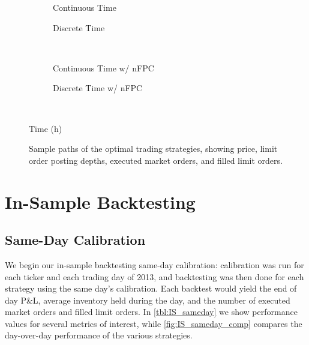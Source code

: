 \begin{figure}
\centering
\begin{subfigure}{.45\linewidth}
  \centering
  \setlength\figureheight{\linewidth} 
  \setlength\figurewidth{\linewidth}
  
    \caption{Continuous Time}
\end{subfigure}%
\hfill%
\begin{subfigure}{.45\linewidth}
  \centering
  \setlength\figureheight{\linewidth} 
  \setlength\figurewidth{\linewidth}
  
  \caption{Discrete Time}
\end{subfigure}\\
\vspace{1cm}
\begin{subfigure}{.45\linewidth}
  \centering
  \setlength\figureheight{\linewidth} 
  \setlength\figurewidth{\linewidth}
  
  \caption{Continuous Time w/ nFPC}
\end{subfigure}%
\hfill%
\begin{subfigure}{.45\linewidth}
  \centering
  \setlength\figureheight{\linewidth} 
  \setlength\figurewidth{\linewidth}
   
  \caption{Discrete Time w/ nFPC}
\end{subfigure}\\
\leavevmode{}\hspace{0pt plus 1filll}\null

Time (h)

\vspace{1cm}%
  \caption{Sample paths of the optimal trading strategies, showing price, limit order posting depths, executed market orders, and filled limit orders.}
  \label{fig:samplepath_inv}
\end{figure}

\FloatBarrier
\section{In-Sample Backtesting}

\subsection{Same-Day Calibration}
We begin our in-sample backtesting same-day calibration: calibration was run for each ticker and each trading day of 2013, and backtesting was then done for each strategy using the same day's calibration. Each backtest would yield the end of day P\&L, average inventory held during the day, and the number of executed market orders and filled limit orders. In \autoref{tbl:IS_sameday} we show performance values for several metrics of interest, while \autoref{fig:IS_sameday_comp} compares the day-over-day performance of the various strategies. 

